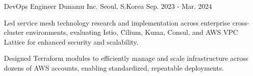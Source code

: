 

\begin{cventries}

  \cventry
    {DevOps Engineer} %
    {Dunamu Inc.} %
    {Seoul, S.Korea} %
    {Sep. 2023 - Mar. 2024} %
    {
      \begin{cvitems} %
        \item {Led service mesh technology research and implementation across enterprise cross-cluster environments, evaluating Istio, Cilium, Kuma, Consul, and AWS VPC Lattice for enhanced security and scalability.}
        \item {Designed Terraform modules to efficiently manage and scale infrastructure across dozens of AWS accounts, enabling standardized, repeatable deployments.}
      \end{cvitems}
    }


\end{cventries}
